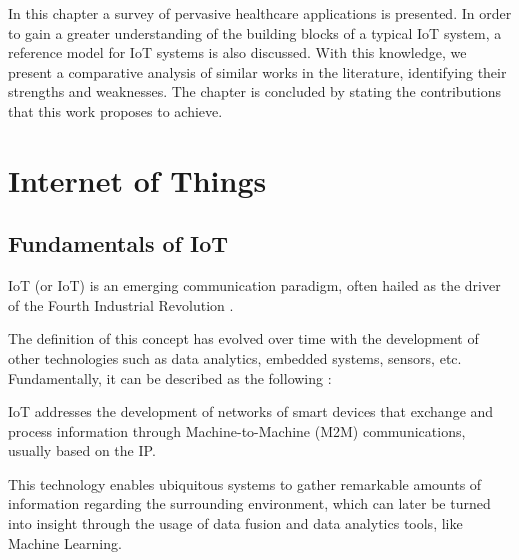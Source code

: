 In this chapter a survey of pervasive healthcare applications is presented. In order to gain a greater understanding of the building blocks of a typical \acf{IoT} system, a reference model for \acs{IoT} systems is also discussed. With this knowledge, we present a comparative analysis of similar works in the literature, identifying their strengths and weaknesses. The chapter is concluded by stating the contributions that this work proposes to achieve.

\section{Internet of Things}

\subsection{Fundamentals of \acs{IoT}}


\acl{IoT} (or \acs{IoT}) is an emerging communication paradigm, often hailed as the driver of the Fourth Industrial Revolution \cite{Aceto2020}. \bigskip

The definition of this concept has evolved over time with the development of other technologies such as data analytics, embedded systems, sensors, etc. Fundamentally, it can be described as the following \cite{Baker2017}: \bigskip

\begin{tcolorbox}[colback=blue!5!white,colframe=blue!75!black]
    \acs{IoT} addresses the development of networks of smart devices that exchange and process information through Machine-to-Machine (M2M) communications, usually based on the \acf{IP}.
\end{tcolorbox}

This technology enables ubiquitous systems to gather remarkable amounts of information regarding the surrounding environment, which can later be turned into insight through the usage of data fusion and data analytics tools, like Machine Learning. \bigskip

